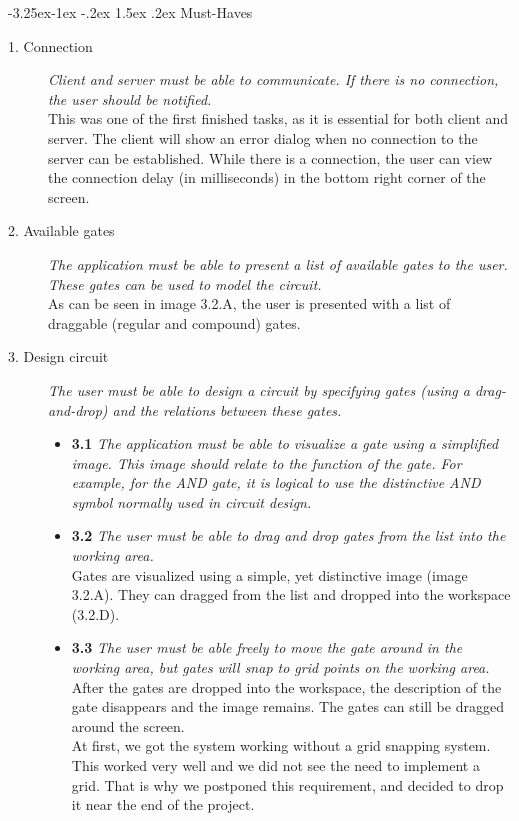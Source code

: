 \documentclass[a4paper]{article}
\makeatletter
\renewcommand\paragraph{\@startsection{paragraph}{4}{\z@}%
  {-3.25ex\@plus -1ex \@minus -.2ex}%
  {1.5ex \@plus .2ex}%
  {\normalfont\normalsize\bfseries}}
\makeatother
\begin{document}
\paragraph{Must-Haves}
\begin{description}
\item[1. Connection] \textit{Client and server must be able to communicate. If there is no connection, the user should be notified.}\\
This was one of the first finished tasks, as it is essential for both client and server. The client will show an error dialog when no connection to the server can be established. While there is a connection, the user can view the connection delay (in milliseconds) in the bottom right corner of the screen.

\item[2. Available gates] \textit{The application must be able to present a list of available gates to the user. These gates can be used to model the circuit.}\\
As can be seen in image 3.2.A, the user is presented with a list of draggable (regular and compound) gates.

\item[3. Design circuit] \textit{The user must be able to design a circuit by specifying gates (using a drag-and-drop) and the relations between these gates.}
	\begin{itemize}
	\item \textbf{3.1} \textit{The application must be able to visualize a gate using a simplified image. This image should relate to the function of the gate. For example, for the AND gate, it is logical to use the distinctive AND symbol normally used in circuit design.}
	\item \textbf{3.2} \textit{The user must be able to drag and drop gates from the list into the working area.}\\
	Gates are visualized using a simple, yet distinctive image (image 3.2.A). They can dragged from the list and dropped into the workspace (3.2.D).

	\item \textbf{3.3} \textit{The user must be able freely to move the gate around in the working area, but gates will snap to grid points on the working area.}\\
	After the gates are dropped into the workspace, the description of the gate disappears and the image remains. The gates can still be dragged around the screen.\\
	At first, we got the system working without a grid snapping system. This worked very well and we did not see the need to implement a grid. That is why we postponed this requirement, and decided to drop it near the end of the project.


\end{itemize}
\end{description}
\end{document}
